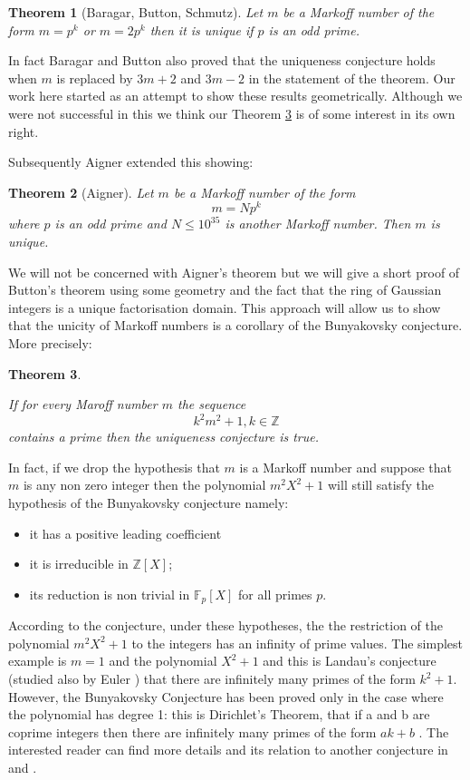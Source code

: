 \documentclass[12pt,a4paper]{amsart}
\newtheorem{thm}{Theorem}[section]
\def\ZZ{\mathbb{Z}}
\begin{document}
 \begin{thm}[Baragar, Button, Schmutz] \label{button}
 Let $m$ be a Markoff number of the form 
 $m=p^k$ or $m=2p^k$ then it is unique
if $p$ is an odd prime.
 \end{thm}

\noindent In fact Baragar and Button also proved that the uniqueness conjecture
holds when $m$ is replaced by $3m+2$ and $3m-2$ in the statement of the
theorem. Our work here started as an attempt to show these results
geometrically. Although we were not successful in this we think our Theorem
\ref{main} is of some interest in its own right.

Subsequently Aigner extended  this showing:
 
 \begin{thm}[Aigner]
 Let $m$ be a Markoff number of the form 
 $$m =Np^k$$
 where $p$ is an odd prime and $N \leq 10^{35}$ is another Markoff number. Then $m$ is unique.
 \end{thm}

We will not be concerned with Aigner's theorem but we will give a short proof
of Button's theorem using some geometry and the fact that the ring of Gaussian
integers is a unique factorisation domain. This approach will allow us to show
that the unicity of Markoff numbers is a corollary of the Bunyakovsky
conjecture. More precisely:

\begin{thm}\label{main}

If for every Maroff number $m$ the sequence $$k^2m^2 + 1, k \in \ZZ$$ contains a
prime then the uniqueness conjecture is true.

\end{thm}

In fact, if we drop the hypothesis that $m$ is a Markoff number and suppose
that $m$ is any non zero integer then the polynomial $m^2 X^2 + 1$ will still
satisfy the hypothesis of the Bunyakovsky conjecture \cite{Bouniakowsky}
namely:

\begin{itemize}
\item it has a positive leading coefficient
\item it is irreducible in  $\ZZ[X]$;
\item its reduction is non trivial in $\mathbb{F}_p[X]$ for all primes $p$.
\end{itemize}

\noindent According to the conjecture, under these hypotheses, the the
restriction of the polynomial  $m^2 X^2 + 1$ to the integers has an infinity of
prime values. The simplest example is $m=1$ and the polynomial $X^2 + 1$ and
this is Landau’s conjecture (studied also by Euler\cite{euler} ) that there are
infinitely many primes of the form $k^2 + 1$. However, the Bunyakovsky
Conjecture has been proved only in the case where the polynomial  has degree 1:
this is Dirichlet’s Theorem, that if a and b are coprime integers then there
are infinitely many primes of the form $ak + b$ . The interested reader can
find more details and its relation to another conjecture in \cite{Pollack} and
\cite{jones}.
\end{document}
